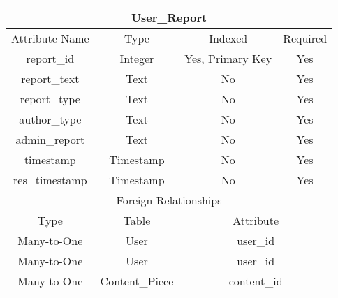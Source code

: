 \documentclass[12pt,letterpaper]{article}
\begin{document}
\begin{center}
\label{UserReport}
\begin{tabular}{|c|c|c|c|}
\hline
\multicolumn{4}{|c|}{User\_Report} \\ \hline
Attribute Name & Type & Indexed & Required \\ \hline
report\_id & Integer & Yes, Primary Key & Yes \\ \hline
report\_text & Text & No & Yes \\ \hline
report\_type & Text & No & Yes \\ \hline %
author\_type & Text & No & Yes \\ \hline %
admin\_report & Text & No & Yes \\ \hline
timestamp & Timestamp & No & Yes \\ \hline
res\_timestamp & Timestamp & No & Yes \\ \hline
\multicolumn{4}{|c|}{Foreign Relationships} \\ \hline
Type & Table & \multicolumn{2}{c|}{Attribute} \\ \hline
Many-to-One & User & \multicolumn{2}{c|}{user\_id} \\ \hline %
Many-to-One & User & \multicolumn{2}{c|}{user\_id} \\ \hline %
Many-to-One & Content\_Piece & \multicolumn{2}{c|}{content\_id} \\ \hline %
\end{tabular}
\end{center}


\end{document}
